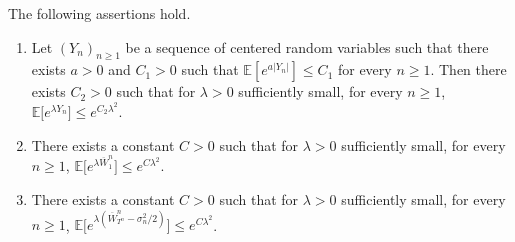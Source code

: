 \documentclass[10pt]{amsart}
\theoremstyle{definition}\newtheorem{defi}[theo]{Definition}\newtheorem{rema}[theo]{Remark}\newtheorem{exam}[theo]{Example}\newtheorem{exem}[theo]{Example}\newtheorem{nota}[theo]{Notation}
\newcommand{\E}{\mathbb{E}}
\newcommand\Es[1]{\mathbb{E}\left[#1\right]}
\begin{document}
 \begin{lemma}
 \label{lem:moments}
 The following assertions hold.
 \begin{enumerate}
 \item[(i)] Let $(Y_{n})_{n \geq 1}$ be a sequence of centered random variables such that there exists $a>0$ and $C_{1}>0$ such that $\Es{e^{a|Y_{n}|}} \leq C_{1}$ for every $n \geq 1$. Then there exists $C_{2}>0$ such that for $\lambda>0$ sufficiently small, for every $n \geq 1$, $\E\big[e^{\lambda Y_{n}}\big] \leq e^{C_{2} \lambda ^{2}}$.
 \item[(ii)]  There exists a constant $C>0$ such that for $\lambda>0$ sufficiently small, for every $n  \geq 1$, $\E\big[e^{\lambda \overline{W}^{n}_{1}}\big] \leq e^{C \lambda ^{2}}$.
 \item[(iii)] There exists a constant $C>0$ such that for $\lambda>0$ sufficiently small, for every $n \geq 1$, $\E\big[{e^{\lambda(\overline{W}^{n}_{T^{n}} - {\sigma_{n}^{2}}/{2} ) }}\big] \leq e^{C \lambda ^{2}}$.
 \end{enumerate}
 \end{lemma}
\end{document}
